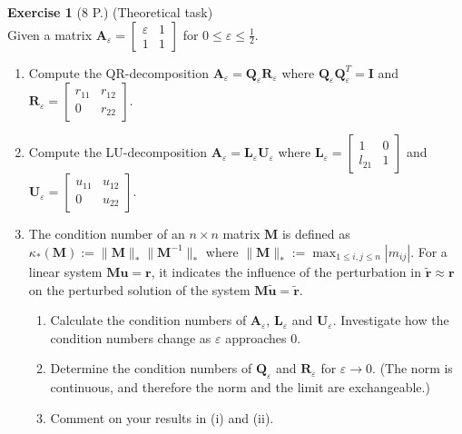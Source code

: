 \documentclass[11pt,a4paper,DIV9,german]{scrartcl}
\theoremstyle{break}   %
\begin{document}
\textbf{Exercise 1} (8 P.) (Theoretical task)\\
Given a matrix \(\mathbf{A}_{\varepsilon}=\begin{bmatrix}\varepsilon&1\\1&1\end{bmatrix}\) for \(0\leq\varepsilon\leq \frac{1}{2}\).
\begin{enumerate}
  \item Compute the QR-decomposition \(\mathbf{A}_{\varepsilon}=\mathbf{Q}_{\varepsilon}\mathbf{R}_{\varepsilon}\) where \(\mathbf{Q}_{\varepsilon}\mathbf{Q}_{\varepsilon}^T=\mathbf{I}\) and \(\mathbf{R}_{\varepsilon}=\begin{bmatrix}r_{11}&r_{12}\\0&r_{22}\end{bmatrix}\).
  \item Compute the LU-decomposition \(\mathbf{A}_{\varepsilon}=\mathbf{L}_{\varepsilon}\mathbf{U}_{\varepsilon}\) where \(\mathbf{L}_{\varepsilon}=\begin{bmatrix}1&0\\l_{21}&1\end{bmatrix}\) and \(\mathbf{U}_{\varepsilon}=\begin{bmatrix}u_{11}&u_{12}\\0&u_{22}\end{bmatrix}\).
  \item The condition number of an \(n\times n\) matrix \(\mathbf{M}\) is defined as \(\kappa_*(\mathbf{M}):=\|\mathbf{M}\|_*\|\mathbf{M}^{-1}\|_*\) where \(\displaystyle \|\mathbf{M}\|_*:=\max_{1\leq{i,j}\leq n} |m_{ij}|\).  For a linear system \(\mathbf{M}\mathbf{u}=\mathbf{r}\), it indicates the influence of the  perturbation  in \(\tilde{\mathbf{r}}\approx \mathbf{r}\) on the perturbed solution of the system \(\mathbf{M}\tilde{\mathbf{u}}=\tilde{\mathbf{r}}\).
  \begin{enumerate}
    \item Calculate the condition numbers of \(\mathbf{A}_{\varepsilon}\), \(\mathbf{L}_{\varepsilon}\) and \(\mathbf{U}_{\varepsilon}\).  Investigate how the condition numbers change as \(\varepsilon\) approaches \(0\).
    \item Determine the condition numbers of \(\mathbf{Q}_\varepsilon\) and \(\mathbf{R}_\varepsilon\) for \(\varepsilon\rightarrow 0\).  (The norm is continuous, and therefore the norm and the limit are exchangeable.)
    \item Comment on your results in (i) and (ii).
  \end{enumerate}
\end{enumerate}
\end{document}
